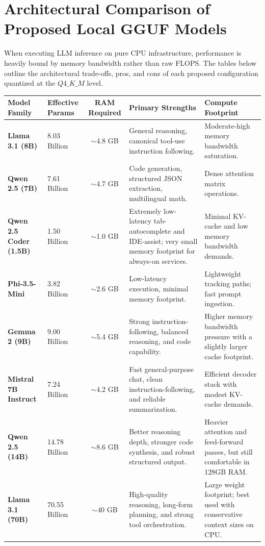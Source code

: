 \documentclass{article}
\begin{document}
\section*{Architectural Comparison of Proposed Local GGUF Models}

When executing LLM inference on pure CPU infrastructure, performance is heavily bound by memory bandwidth rather than raw FLOPS. The tables below outline the architectural trade-offs, pros, and cons of each proposed configuration quantized at the $Q4\_K\_M$ level.

\noindent
\small
\begin{tabularx}{\textwidth}{l p{2.0cm} c >{\raggedright\arraybackslash}X >{\raggedright\arraybackslash}X}
\toprule
\textbf{Model Family} & \textbf{Effective Params} & \textbf{RAM Required} & \textbf{Primary Strengths} & \textbf{Compute Footprint} \\
\midrule
\textbf{Llama 3.1 (8B)} & 8.03 Billion & $\sim$4.8 GB & General reasoning, canonical tool-use instruction following. & Moderate-high memory bandwidth saturation. \\
\textbf{Qwen 2.5 (7B)} & 7.61 Billion & $\sim$4.7 GB & Code generation, structured JSON extraction, multilingual math. & Dense attention matrix operations. \\
\textbf{Qwen 2.5 Coder (1.5B)} & 1.50 Billion & $\sim$1.0 GB & Extremely low-latency tab-autocomplete and IDE-assist; very small memory footprint for always-on services. & Minimal KV-cache and low memory bandwidth demands. \\
\textbf{Phi-3.5-Mini} & 3.82 Billion & $\sim$2.6 GB & Low-latency execution, minimal memory footprint. & Lightweight tracking paths; fast prompt ingestion. \\
\textbf{Gemma 2 (9B)} & 9.00 Billion & $\sim$5.4 GB & Strong instruction-following, balanced reasoning, and code capability. & Higher memory bandwidth pressure with a slightly larger cache footprint. \\
\textbf{Mistral 7B Instruct} & 7.24 Billion & $\sim$4.2 GB & Fast general-purpose chat, clean instruction-following, and reliable summarization. & Efficient decoder stack with modest KV-cache demands. \\
\textbf{Qwen 2.5 (14B)} & 14.78 Billion & $\sim$8.6 GB & Better reasoning depth, stronger code synthesis, and robust structured output. & Heavier attention and feed-forward passes, but still comfortable in 128GB RAM. \\
\textbf{Llama 3.1 (70B)} & 70.55 Billion & $\sim$40 GB & High-quality reasoning, long-form planning, and strong tool orchestration. & Large weight footprint; best used with conservative context sizes on CPU. \\
\bottomrule
\end{tabularx}
\end{document}
